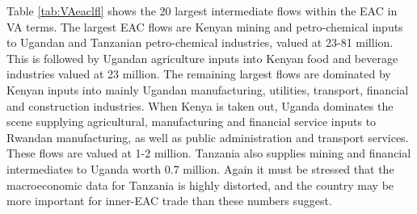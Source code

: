 \documentclass[a4paper]{article}
\begin{document}

Table \ref{tab:VAeaclfl} shows the 20 largest intermediate flows within the EAC in VA terms. %
The largest EAC flows are Kenyan mining and petro-chemical inputs to Ugandan and Tanzanian petro-chemical industries, valued at 23-81 million. This is followed by Ugandan agriculture inputs into Kenyan food and beverage industries valued at 23 million. The remaining largest flows are dominated by Kenyan inputs into mainly Ugandan manufacturing, utilities, transport, financial and construction industries. When Kenya is taken out, Uganda dominates the scene supplying agricultural, manufacturing and financial service inputs to Rwandan manufacturing, as well as public administration and transport services. These flows are valued at 1-2 million. Tanzania also supplies mining and financial intermediates to Uganda worth 0.7 million. Again it must be stressed that the macroeconomic data for Tanzania is highly distorted, and the country may be more important for inner-EAC trade than these numbers suggest. 
\end{document}
